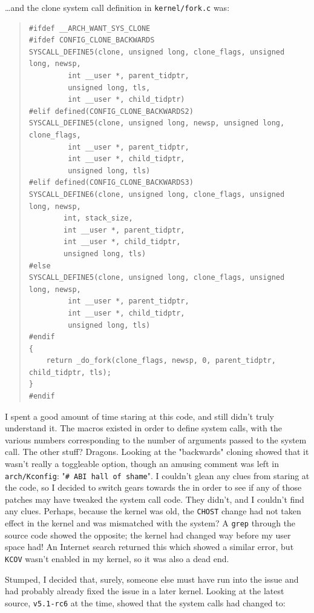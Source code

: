 \documentclass{article}
\begin{document}
\ldots and the clone system call definition in \texttt{kernel/fork.c} was:

\begin{quote}
\begin{verbatim}
#ifdef __ARCH_WANT_SYS_CLONE
#ifdef CONFIG_CLONE_BACKWARDS
SYSCALL_DEFINE5(clone, unsigned long, clone_flags, unsigned long, newsp,
		 int __user *, parent_tidptr,
		 unsigned long, tls,
		 int __user *, child_tidptr)
#elif defined(CONFIG_CLONE_BACKWARDS2)
SYSCALL_DEFINE5(clone, unsigned long, newsp, unsigned long, clone_flags,
		 int __user *, parent_tidptr,
		 int __user *, child_tidptr,
		 unsigned long, tls)
#elif defined(CONFIG_CLONE_BACKWARDS3)
SYSCALL_DEFINE6(clone, unsigned long, clone_flags, unsigned long, newsp,
		int, stack_size,
		int __user *, parent_tidptr,
		int __user *, child_tidptr,
		unsigned long, tls)
#else
SYSCALL_DEFINE5(clone, unsigned long, clone_flags, unsigned long, newsp,
		 int __user *, parent_tidptr,
		 int __user *, child_tidptr,
		 unsigned long, tls)
#endif
{
	return _do_fork(clone_flags, newsp, 0, parent_tidptr, child_tidptr, tls);
}
#endif
\end{verbatim}
\end{quote}

I spent a good amount of time staring at this code, and still didn't truly understand it.  The macros existed in order to define system calls, with the various numbers corresponding to the number of arguments passed to the system call.  The other stuff?  Dragons.  Looking at the "backwards" cloning showed that it wasn't really a toggleable option, though an amusing comment was left in \texttt{arch/Kconfig}: "\texttt{# ABI hall of shame}".  I couldn't glean any clues from staring at the code, so I decided to switch gears towards the  in order to see if any of those patches may have tweaked the system call code.  They didn't, and I couldn't find any clues.  Perhaps, because the kernel was old, the \texttt{CHOST} change had not taken effect in the kernel and was mismatched with the system?  A \texttt{grep} through the source code showed the opposite; the kernel had changed way before my user space had!  An Internet search returned this  which showed a similar error, but \texttt{KCOV} wasn't enabled in my kernel, so it was also a dead end.

Stumped, I decided that, surely, someone else must have run into the issue and had probably already fixed the issue in a later kernel.  Looking at the latest source, \texttt{v5.1-rc6} at the time, showed that the system calls had changed to:
\end{document}
